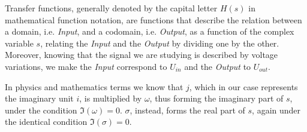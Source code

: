\documentclass[a4paper, 10pt, final]{article} %
\begin{document}
    Transfer functions, generally denoted by the capital letter $H(s)$ in mathematical function notation, are functions that describe the relation between a domain, i.e. \emph{Input}, and a codomain, i.e. \emph{Output}, as a function of the complex variable $s$, relating the \emph{Input} and the \emph{Output} by dividing one by the other.
    Moreover, knowing that the signal we are studying is described by voltage variations, we make the \emph{Input} correspond to $U_{in}$ and the \emph{Output} to $U_{out}$.

    In physics and mathematics terms we know that $j$, which in our case represents the imaginary unit \(i\), is multiplied by $\omega$, thus forming the imaginary part of $s$, under the condition $\Im(\omega) = 0$.
    \(\sigma\), instead, forms the real part of \(s\), again under the identical condition $\Im(\sigma) = 0$.
\end{document}
